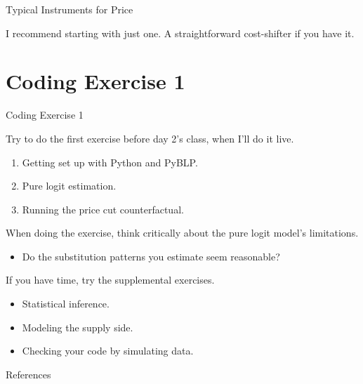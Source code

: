 \documentclass[aspectratio=169,t,11pt,table]{beamer}
\begin{document}
\begin{frame}{Typical Instruments for Price}
\begin{wideitemize}
        \pause
        \item I recommend starting with just one. A straightforward cost-shifter if you have it.
    \end{wideitemize}
\end{frame}

\section{Coding Exercise 1}

\begin{frame}{Coding Exercise 1}
    \begin{wideitemize}
        \item Try to do the first exercise before day 2's class, when I'll do it live.
        \begin{enumerate}
            \item Getting set up with Python and PyBLP.
            \item Pure logit estimation.
            \item Running the price cut counterfactual.
        \end{enumerate}
        \pause
        \item When doing the exercise, think critically about the pure logit model's limitations.
        \begin{itemize}
            \item Do the substitution patterns you estimate seem reasonable?
        \end{itemize}
        \pause
        \item If you have time, try the supplemental exercises.
        \begin{itemize}
            \item Statistical inference.
            \item Modeling the supply side.
            \item Checking your code by simulating data.
        \end{itemize}
    \end{wideitemize}
\end{frame}

\backupbegin

\begin{frame}{References}
    
\end{frame}

\backupend
\end{document}
